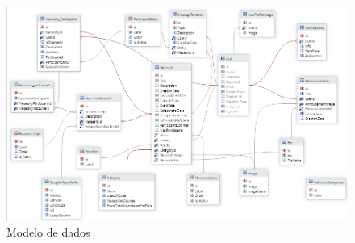 \begin{figure}[H]
  \centering 
  \includegraphics[scale=0.5]{figures/DataModel.png}
  \caption{Modelo de dados}\label{fig:modeloDados}
\end{figure}

